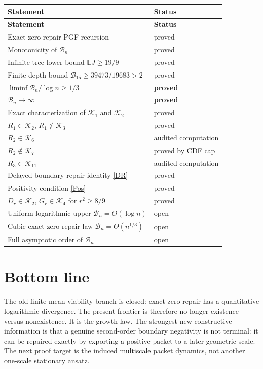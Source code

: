 \documentclass[11pt,a4paper]{article}
\newcommand{\E}{\mathbb E}
\newcommand{\cB}{\mathcal B}
\newcommand{\cK}{\mathcal K}
\newcommand{\1}{\mathbf 1}
\begin{document}
\small
\begin{longtable}{p{}|p{}}
\textbf{Statement} & \textbf{Status}\\
\hline
\endfirsthead
\textbf{Statement} & \textbf{Status}\\
\hline
\endhead
Exact zero-repair PGF recursion & proved\\
Monotonicity of \(\cB_n\) & proved\\
Infinite-tree lower bound \(\E J\ge19/9\) & proved\\
Finite-depth bound \(\cB_{15}\ge39473/19683>2\) & proved\\
\(\liminf \cB_n/\log n\ge1/3\) & \textbf{proved}\\
\(\cB_n\to\infty\) & \textbf{proved}\\
Exact characterization of \(\cK_1\) and \(\cK_2\) & proved\\
\(R_1\in\cK_2\), \(R_1\notin\cK_3\) & proved\\
\(R_2\in\cK_6\) & audited computation\\
\(R_2\notin\cK_7\) & proved by CDF cap\\
\(R_3\in\cK_{11}\) & audited computation\\
Delayed boundary-repair identity \eqref{DR} & proved\\
Positivity condition \eqref{Pos} & proved\\
\(D_r\in\cK_2\), \(G_r\in\cK_4\) for \(r^2\ge8/9\) & proved\\
Uniform logarithmic upper \(\cB_n=O(\log n)\) & \textcolor{frontierred}{open}\\
Cubic exact-zero-repair law \(\cB_n=\Theta(n^{1/3})\) & \textcolor{frontierred}{open}\\
Full asymptotic order of \(\cB_n\) & \textcolor{frontierred}{open}
\end{longtable}
\normalsize

\section*{Bottom line}
The old finite-mean viability branch is closed: exact zero repair has a
quantitative logarithmic divergence.  The present frontier is therefore no
longer existence versus nonexistence.  It is the growth law.  The strongest new
constructive information is that a genuine second-order boundary negativity is
not terminal: it can be repaired exactly by exporting a positive packet to a
later geometric scale.  The next proof target is the induced multiscale packet
dynamics, not another one-scale stationary ansatz.
\end{document}
